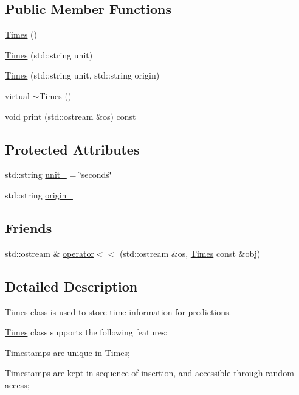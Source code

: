 \subsection*{Public Member Functions}
\begin{DoxyCompactItemize}
\item 
\mbox{\hyperlink{class_times_a8ba246100f3c12f80abeb3beb93446f6}{Times}} ()
\item 
\mbox{\hyperlink{class_times_a49de9639125c133a6b0e4351eaa422b5}{Times}} (std\+::string unit)
\item 
\mbox{\hyperlink{class_times_aec85fed5d7741b4ea2445874b3ecadfe}{Times}} (std\+::string unit, std\+::string origin)
\item 
virtual \mbox{\hyperlink{class_times_a7989831a284e9d10e3ae96ceb2349a3c}{$\sim$\+Times}} ()
\item 
void \mbox{\hyperlink{class_times_acdfa95279c544d2cee2f33415fe4909c}{print}} (std\+::ostream \&os) const
\end{DoxyCompactItemize}
\subsection*{Protected Attributes}
\begin{DoxyCompactItemize}
\item 
std\+::string \mbox{\hyperlink{class_times_a32130156e076d5511c44fc71ee68a980}{unit\+\_\+}} = \char`\"{}seconds\char`\"{}
\item 
std\+::string \mbox{\hyperlink{class_times_a7609195d9216105cad01df13230abfa9}{origin\+\_\+}}
\end{DoxyCompactItemize}
\subsection*{Friends}
\begin{DoxyCompactItemize}
\item 
std\+::ostream \& \mbox{\hyperlink{class_times_a0c37c7d9833e9b02d1a219555f55fe34}{operator$<$$<$}} (std\+::ostream \&os, \mbox{\hyperlink{class_times}{Times}} const \&obj)
\end{DoxyCompactItemize}


\subsection{Detailed Description}
\mbox{\hyperlink{class_times}{Times}} class is used to store time information for predictions. 

\mbox{\hyperlink{class_times}{Times}} class supports the following features\+:
\begin{DoxyEnumerate}
\item Timestamps are unique in \mbox{\hyperlink{class_times}{Times}};
\item Timestamps are kept in sequence of insertion, and accessible through random access; 
\end{DoxyEnumerate}

